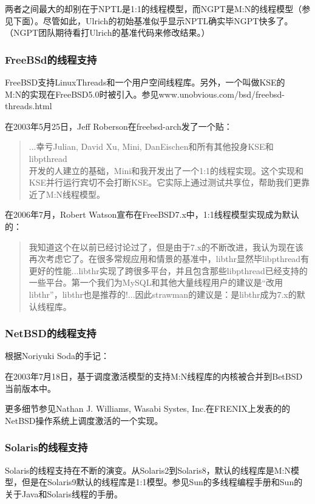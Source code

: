\documentclass[twoside, xetex]{report}
\begin{document}
	两者之间最大的却别在于NPTL是1:1的线程模型，而NGPT是M:N的线程模型（参见下面）。尽管如此，Ulrich的初始基准似乎显示NPTL确实毕NGPT快多了。（NGPT团队期待看打Ulrich的基准代码来修改结果。）

\subsubsection*{FreeBSd的线程支持}
	
	FreeBSD支持LinuxThreads和一个用户空间线程库。另外，一个叫做KSE的\\M:N的实现在FreeBSD5.0时被引入。参见www.unobvious.com/bsd/freebsd-threads.html

	在2003年5月25日，Jeff Roberson在freebsd-arch发了一个贴：
	\begin{quotation}
		...幸亏Julian, David Xu, Mini, DanEischen和所有其他投身KSE和libpthread\\开发的人建立的基础，Mini和我开发出了一个1:1的线程实现。这个实现和KSE并行运行宾切不会打断KSE。它实际上通过测试共享位，帮助我们更靠近了M:N线程模型。
	\end{quotation}

	在2006年7月，Robert Watson宣布在FreeBSD7.x中，1:1线程模型实现成为默认的：

	\begin{quotation}
		我知道这个在以前已经讨论过了，但是由于7.x的不断改进，我认为现在该再次考虑它了。在很多常规应用和情景的基准中，libthr显然毕libpthread有更好的性能...libthr实现了跨很多平台，并且包含那些libpthread已经支持的一些平台。第一个我们为MySQL和其他大量线程用户的建议是“改用libthr”，libthr也是推荐的!...因此strawman的建议是：是libthr成为7.x的默认线程库。
	\end{quotation}

\subsubsection*{NetBSD的线程支持}
		根据Noriyuki Soda的手记：
		
		在2003年7月18日，基于调度激活模型的支持M:N线程库的内核被合并到BetBSD当前版本中。

		更多细节参见Nathan J. Williams, Wasabi Systes, Inc.在FRENIX上发表的的\\NetBSD操作系统上调度激活的一个实现。
\subsubsection*{Solaris的线程支持}
	
	Solaris的线程支持在不断的演变。从Solaris2到Solaris8，默认的线程库是M:N模型，但是在Solaris9默认的线程库是1:1模型。参见Sun的多线程编程手册和Sun的关于Java和Solaris线程的手册。
\end{document}
